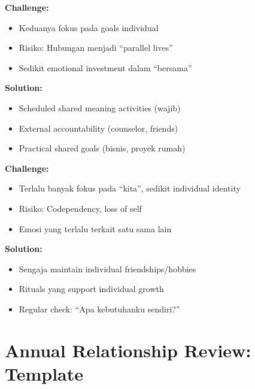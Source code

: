 \begin{praktikbox}
\textbf{Challenge:}
\begin{itemize}
    \item Keduanya fokus pada goals individual
    \item Risiko: Hubungan menjadi ``parallel lives''
    \item Sedikit emotional investment dalam ``bersama''
\end{itemize}

\textbf{Solution:}
\begin{itemize}
    \item Scheduled shared meaning activities (wajib)
    \item External accountability (counselor, friends)
    \item Practical shared goals (bisnis, proyek rumah)
\end{itemize}
\end{praktikbox}

\begin{praktikbox}
\textbf{Challenge:}
\begin{itemize}
    \item Terlalu banyak fokus pada ``kita'', sedikit individual identity
    \item Risiko: Codependency, loss of self
    \item Emosi yang terlalu terkait satu sama lain
\end{itemize}

\textbf{Solution:}
\begin{itemize}
    \item Sengaja maintain individual friendships/hobbies
    \item Rituals yang support individual growth
    \item Regular check: ``Apa kebutuhanku sendiri?''
\end{itemize}
\end{praktikbox}

\section{Annual Relationship Review: Template}

